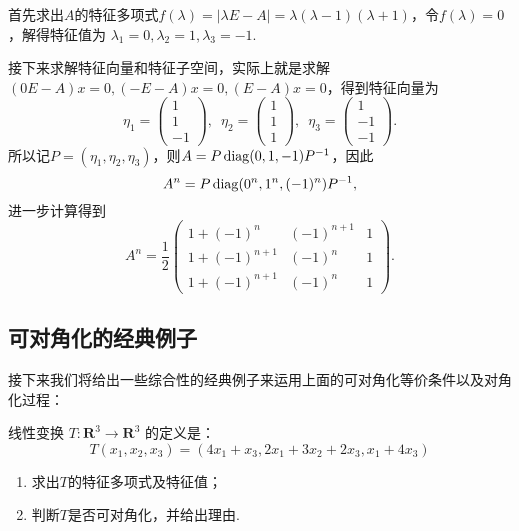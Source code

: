 \begin{solution}
    首先求出$A$的特征多项式$f(\lambda)=|\lambda E-A|=\lambda(\lambda-1)(\lambda+1)$，令$f(\lambda)=0$，解得特征值为 $\lambda_1=0,\lambda_2=1,\lambda_3=-1$.

    接下来求解特征向量和特征子空间，实际上就是求解$(0E-A)x=0,(-E-A)x=0,(E-A)x=0$，得到特征向量为
    \[\eta_1=\begin{pmatrix}
            1 \\ 1 \\ -1
        \end{pmatrix},\enspace \eta_2=\begin{pmatrix}
            1 \\ 1 \\ 1
        \end{pmatrix},\enspace \eta_3=\begin{pmatrix}
            1 \\ -1 \\ -1
        \end{pmatrix}.\]
    所以记$P=(\eta_1,\eta_2,\eta_3)$，则$A=P\operatorname{diag}(0,1,-1)P^{-1}$，因此
    \[A^n=P\operatorname{diag}(0^n,1^n,(-1)^n)P^{-1},\]
    进一步计算得到
    \[A^n=\frac{1}{2}\begin{pmatrix}
            1+(-1)^n     & (-1)^{n+1} & 1 \\
            1+(-1)^{n+1} & (-1)^n     & 1 \\
            1+(-1)^{n+1} & (-1)^n     & 1
        \end{pmatrix}.\]
\end{solution}

\subsection{可对角化的经典例子}

接下来我们将给出一些综合性的经典例子来运用上面的可对角化等价条件以及对角化过程：
\begin{example}
    线性变换 $T : \mathbf{R}^3 \to \mathbf{R}^3$ 的定义是：
    \[T(x_1,x_2,x_3)=(4x_1+x_3,2x_1+3x_2+2x_3,x_1+4x_3)\]
    \begin{enumerate}
        \item 求出$T$的特征多项式及特征值；

        \item 判断$T$是否可对角化，并给出理由.
    \end{enumerate}
\end{example}

